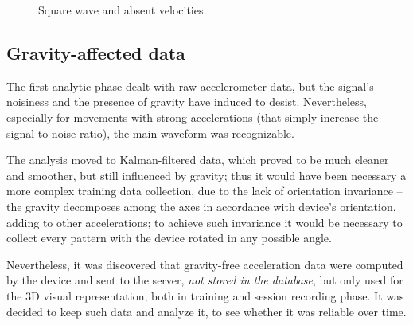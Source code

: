 \begin{center}
	\begin{figure}[ht]
		\caption{Square wave and absent velocities.}
	\end{figure}
\end{center}

\subsection{Gravity-affected data}
The first analytic phase dealt with raw accelerometer data, but the signal's noisiness and the presence of gravity have induced to desist. Nevertheless, especially for movements with strong accelerations (that simply increase the signal-to-noise ratio), the main waveform was recognizable.
\bigbreak

The analysis moved to Kalman-filtered data, which proved to be much cleaner and smoother, but still influenced by gravity; thus it would have been necessary a more complex training data collection, due to the lack of orientation invariance – the gravity decomposes among the axes in accordance with device's orientation, adding to other accelerations; to achieve such invariance it would be necessary to collect every pattern with the device rotated in any possible angle.

Nevertheless, it was discovered that gravity-free acceleration data were computed by the device and sent to the server, \textit{not stored in the database}, but only used for the 3D visual representation, both in training and session recording phase. It was decided to keep such data and analyze it, to see whether it was reliable over time.
\bigbreak

